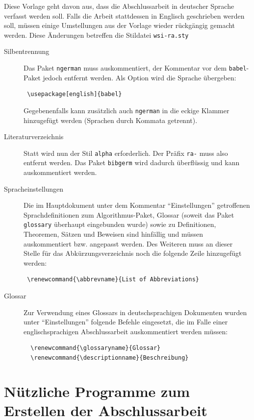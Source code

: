 Diese Vorlage geht davon aus, dass die Abschlussarbeit in deutscher Sprache
verfasst werden soll. Falls die Arbeit stattdessen in Englisch geschrieben
werden soll, müssen einige Umstellungen aus der Vorlage wieder rückgängig
gemacht werden. Diese Änderungen betreffen die Stildatei \texttt{wsi-ra.sty}
\begin{description}
 \item[Silbentrennung] Das Paket \verb!ngerman! muss auskommentiert, der
 Kommentar vor dem \verb!babel!-Paket jedoch entfernt werden. Als Option wird
 die Sprache übergeben:
 \begin{verbatim}
 \usepackage[english]{babel}
 \end{verbatim}
 Gegebenenfalls kann zusätzlich auch \verb!ngerman!
 in die eckige Klammer hinzugefügt werden (Sprachen durch Kommata getrennt).
 \item[Literaturverzeichnis] Statt \verb!! wird nun
 der Stil \verb!alpha! erforderlich. Der Präfix \verb!ra-! muss also entfernt
 werden. Das Paket \verb!bibgerm! wird dadurch überflüssig und kann
 auskommentiert werden.
 \item[Spracheinstellungen] Die im Hauptdokument unter dem Kommentar
 "`Einstellungen"' getroffenen Sprachdefinitionen zum Algorithmus-Paket, Glossar
 (soweit das Paket \verb!glossary! überhaupt eingebunden wurde) sowie zu
 Definitionen, Theoremen, Sätzen und Beweisen sind hinfällig und müssen
 auskommentiert bzw. angepasst werden. Des Weiteren muss an dieser
 Stelle für das Abkürzungsverzeichnis noch die folgende Zeile hinzugefügt
 werden:
 \begin{verbatim}
 \renewcommand{\abbrevname}{List of Abbreviations}
 \end{verbatim}
 \item[Glossar] Zur Verwendung eines Glossars in deutschsprachigen Dokumenten
  wurden unter "`Einstellungen"' folgende Befehle eingesetzt, die im Falle einer
  englischsprachigen Abschlussarbeit auskommentiert werden müssen:
  \begin{verbatim}
  \renewcommand{\glossaryname}{Glossar}
  \renewcommand{\descriptionname}{Beschreibung}
  \end{verbatim}
\end{description}


\section{Nützliche Programme zum Erstellen der Abschlussarbeit}

